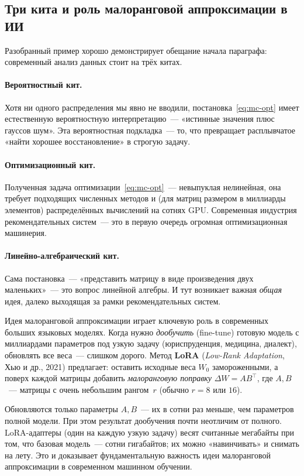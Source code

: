 \subsection{Три кита и роль малоранговой аппроксимации в ИИ}

Разобранный пример хорошо демонстрирует обещание начала параграфа:
современный анализ данных стоит на трёх китах.

\paragraph{Вероятностный кит.}
Хотя ни одного распределения мы явно не вводили, постановка~\eqref{eq:mc-opt}
имеет естественную вероятностную интерпретацию~--- «истинные значения
плюс гауссов шум». Эта вероятностная подкладка~--- то, что превращает
расплывчатое «найти хорошее восстановление» в строгую задачу.

\paragraph{Оптимизационный кит.}
Полученная задача оптимизации~\eqref{eq:mc-opt}~--- невыпуклая
нелинейная, она требует подходящих численных методов и (для матриц
размером в миллиарды элементов) распределённых вычислений на сотнях
GPU. Современная индустрия рекомендательных систем~--- это в первую
очередь огромная оптимизационная машинерия.

\paragraph{Линейно-алгебраический кит.}
Сама постановка~--- «представить матрицу в виде произведения двух
маленьких»~--- это вопрос линейной алгебры. И тут возникает важная
\emph{общая} идея, далеко выходящая за рамки рекомендательных систем.

\begin{notebox}[title={\textbf{LoRA: малоранговые поправки в больших языковых моделях}}]
Идея малоранговой аппроксимации играет ключевую роль в современных
больших языковых моделях. Когда нужно \emph{дообучить} (fine-tune)
готовую модель с миллиардами параметров под узкую задачу
(юриспруденция, медицина, диалект), обновлять все веса~--- слишком
дорого. Метод \textbf{LoRA} (\emph{Low-Rank Adaptation}, Хью и др.,
2021) предлагает: оставить исходные веса $W_0$ замороженными, а
поверх каждой матрицы добавить \emph{малоранговую поправку}
$\Delta W=A B^{\top}$, где $A,B$~--- матрицы с очень небольшим
рангом~$r$ (обычно $r=8$ или $16$).

Обновляются только параметры $A,B$~--- их в сотни раз меньше, чем
параметров полной модели. При этом результат дообучения почти
неотличим от полного. LoRA-адаптеры (один на каждую узкую задачу)
весят считанные мегабайты при том, что базовая модель~--- сотни
гигабайтов; их можно «навинчивать» и снимать на лету. Это и
доказывает фундаментальную важность идеи малоранговой
аппроксимации в современном машинном обучении.
\end{notebox}


